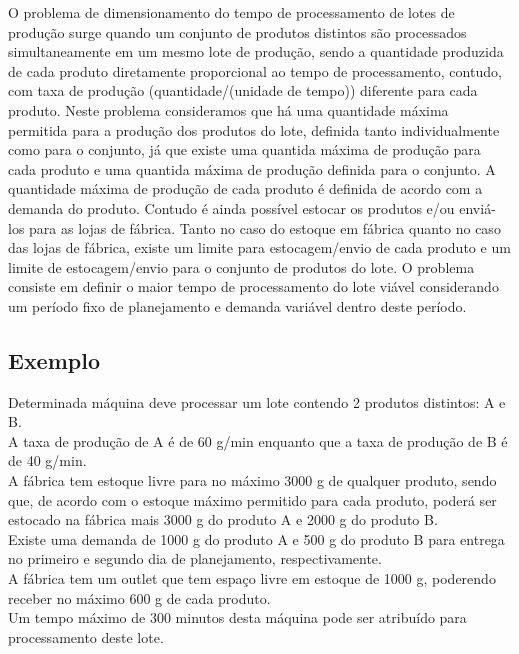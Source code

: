 \documentclass{book}
\begin{document}
O problema de dimensionamento do tempo de processamento de lotes de produção surge quando um conjunto de produtos distintos são processados simultaneamente em um mesmo lote de produção, sendo a quantidade produzida de cada produto diretamente proporcional ao tempo de processamento, contudo, com taxa de produção (quantidade/(unidade de tempo)) diferente para cada produto. Neste problema consideramos que há uma quantidade máxima permitida para a produção dos produtos do lote, definida tanto individualmente como para o conjunto, já que existe uma quantida máxima de produção para cada produto e uma quantida máxima de produção definida para o conjunto. A quantidade máxima de produção de cada produto é definida de acordo com a demanda do produto. Contudo é ainda possível estocar os produtos e/ou enviá-los para as lojas de fábrica. Tanto no caso do estoque em fábrica quanto no caso das lojas de fábrica, existe um limite para estocagem/envio de cada produto e um limite de estocagem/envio para o conjunto de produtos do lote. O problema consiste em definir o maior tempo de processamento do lote viável considerando um período fixo de planejamento e demanda variável dentro deste período.

\subsection{Exemplo}

Determinada máquina deve processar um lote contendo 2 produtos distintos: A e B. \\

A taxa de produção de A é de 60 g/min enquanto que a taxa de produção de B é de 40 g/min. \\

A fábrica tem estoque livre para no máximo 3000 g de qualquer produto, sendo que, de acordo com o estoque máximo permitido para cada produto, poderá ser estocado na fábrica mais 3000 g do produto A e 2000 g do produto B. \\

Existe uma demanda de 1000 g do produto A e 500 g do produto B para entrega no primeiro e segundo dia de planejamento, respectivamente. \\

A fábrica tem um outlet que tem espaço livre em estoque de 1000 g, poderendo receber no máximo 600 g de cada produto. \\

Um tempo máximo de 300 minutos desta máquina pode ser atribuído para processamento deste lote. \\
\end{document}
